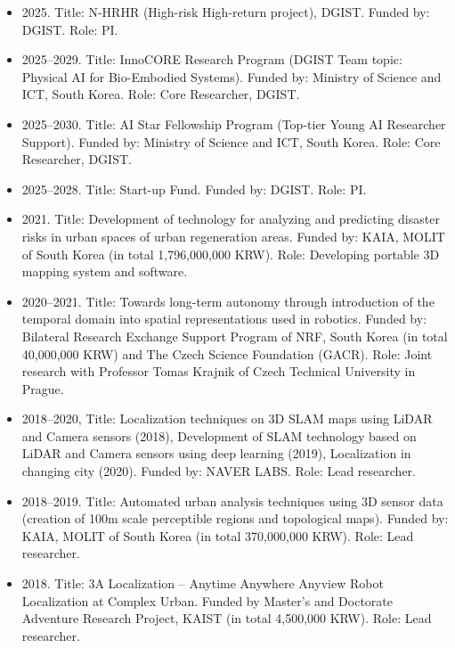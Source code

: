 \documentclass{cv} %
\begin{document}
\begin{itemize}[label=$\cdot$]
\item 2025. Title: N-HRHR (High-risk High-return project), DGIST. Funded by: DGIST. Role: PI.
\vspace{-1mm}
\item 2025--2029. Title: InnoCORE Research Program (DGIST Team topic: Physical AI for Bio-Embodied Systems). Funded by: Ministry of Science and ICT, South Korea. Role: Core Researcher, DGIST.
\vspace{-1mm}
\item 2025--2030. Title: AI Star Fellowship Program (Top-tier Young AI Researcher Support). Funded by: Ministry of Science and ICT, South Korea. Role: Core Researcher, DGIST.
\vspace{-1mm}
\item 2025--2028. Title: Start-up Fund. Funded by: DGIST. Role: PI.
\vspace{-1mm}
\item 2021. Title: Development of technology for analyzing and predicting disaster risks in urban spaces of urban regeneration areas. Funded by: KAIA, MOLIT of South Korea (in total 1,796,000,000 KRW). Role: Developing portable 3D mapping system and software. 
\vspace{-1mm}
\item 2020--2021. Title: Towards long-term autonomy through introduction of the temporal domain into spatial representations used in robotics. Funded by: Bilateral Research Exchange Support Program of NRF, South Korea (in total 40,000,000 KRW) and The Czech Science Foundation (GACR). Role: Joint research with Professor Tomas Krajnik of Czech Technical University in Prague.
\vspace{-1mm}
\item 2018--2020, Title: Localization techniques on 3D SLAM maps using LiDAR and Camera sensors (2018), Development of SLAM technology based on LiDAR and Camera sensors using deep learning (2019), Localization in changing city (2020). Funded by: NAVER LABS. Role: Lead researcher.
\vspace{-1mm}
\item 2018--2019. Title: Automated urban analysis techniques using 3D sensor data (creation of 100m scale perceptible regions and topological maps). Funded by: KAIA, MOLIT of South Korea (in total 370,000,000 KRW). Role: Lead researcher.
\vspace{-1mm}
\item 2018. Title: 3A Localization -- Anytime Anywhere Anyview Robot Localization at Complex Urban. Funded by Master's and Doctorate Adventure Research Project, KAIST (in total 4,500,000 KRW). Role: Lead researcher.

\end{itemize}
\end{document}
